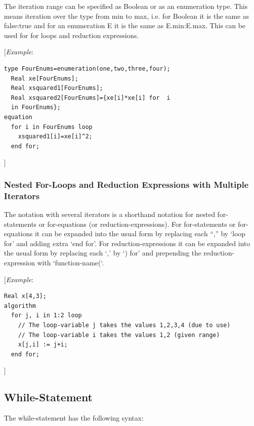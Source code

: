 \documentclass[10pt,a4paper]{report}
\def\doublelabel#1{\label{#1}\hypertarget{#1}{}}
\begin{document}
The iteration range can be specified as Boolean or as an enumeration
type. This means iteration over the type from min to max, i.e. for
Boolean it is the same as false:true and for an enumeration E it is the
same as E.min:E.max. This can be used for for loops and reduction
expressions.

{[}\emph{Example}:

\begin{lstlisting}[language=modelica]
  type FourEnums=enumeration(one,two,three,four);
  Real xe[FourEnums];
  Real xsquared1[FourEnums];
  Real xsquared2[FourEnums]={xe[i]*xe[i] for  i
  in FourEnums};
equation
  for i in FourEnums loop
    xsquared1[i]=xe[i]^2;
  end for;
\end{lstlisting}
{]}

\subsubsection{Nested For-Loops and Reduction Expressions with Multiple Iterators}\doublelabel{nested-for-loops-and-reduction-expressions-with-multiple-iterators}

The notation with several iterators is a shorthand notation for nested
for-statements or for-equations (or reduction-expressions). For
for-statements or for-equations it can be expanded into the usual form
by replacing each ``,'' by `loop for' and adding extra `end for'. For
reduction-expressions it can be expanded into the usual form by
replacing each `,' by `) for' and prepending the reduction-expression
with `function-name(`.

{[}\emph{Example}:

\begin{lstlisting}[language=modelica]
  Real x[4,3];
algorithm
  for j, i in 1:2 loop
    // The loop-variable j takes the values 1,2,3,4 (due to use)
    // The loop-variable i takes the values 1,2 (given range)
    x[j,i] := j+i;
  end for;
\end{lstlisting}
{]}

\subsection{While-Statement}\doublelabel{while-statement}

The while-statement has the following syntax:
\end{document}
